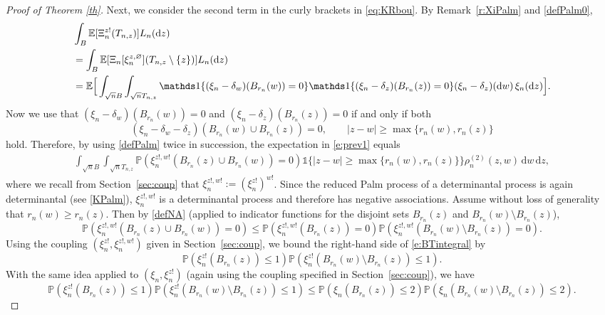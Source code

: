 \documentclass{amsart}
\theoremstyle{plain}
\theoremstyle{definition}
\theoremstyle{remark}
\def\E{\mathbb E}
\def\P{\mathbb P}
\def\one{\mathds1}
\def\d{\mathrm d}
\begin{document}
\begin{proof}[Proof of Theorem \ref{th}]
Next, we consider the second term in the curly brackets in \eqref{eq:KRbou}. By Remark~\ref{r:XiPalm} and \eqref{defPalm0},
\begin{align}
	&\int_{B}  \E[\Xi_n^{z!}(T_{n,z})] L_n(\d z)\notag \\
	&=\int_{B}  \E[\Xi_n[\xi_n^{z,\varnothing}](T_{n,z}\setminus \{z\})] L_n(\d z)\notag \\
	&=\E\Big[\int_{\sqrt n B} \int_{\sqrt n T_{n,z}} \one\{(\xi_n-\delta_w)(B_{r_n}(w)) =0\} \one\{(\xi_n-\delta_z)(B_{r_n}(z)) =0\} (\xi_n-\delta_z) (\d w)\,  \xi_n(\d z)\Big].\label{e:prev1}
\end{align}
Now we use that $(\xi_n-\delta_w)(B_{r_n}(w)) =0$ and $(\xi_n-\delta_z)(B_{r_n}(z)) =0$ if and only if both 
\[ (\xi_n-\delta_w-\delta_z)(B_{r_n}(w) \cup B_{r_n}(z)) =0, \qquad |z-w|\ge \max\{r_n(w),r_n(z)\}\]
hold.  Therefore, by using \eqref{defPalm} twice in succession, the expectation in \eqref{e:prev1} equals 
\begin{align}\label{e:2ndterm}
\int_{\sqrt n B} \int_{\sqrt n T_{n,z}} \P(\xi_n^{z!, w!}(B_{r_n}(z) \cup B_{r_n}(w))=0)\one\{|z-w|\ge \max\{r_n(w),r_n(z)\}\}  \rho_n^{(2)}(z,w) \, \d w \, \d z,
\end{align}
where we recall from Section~\ref{sec:coup} that $\xi_n^{z!, w!}:=(\xi_n^{z!})^{w!}$. Since the reduced Palm process of a determinantal process is again determinantal (see \eqref{KPalm}), $\xi_n^{z!, w!}$ is a determinantal process and therefore has negative associations. Assume without loss of generality that $r_n(w) \ge r_n(z)$. Then by \eqref{defNA} (applied to indicator functions for the disjoint sets $B_{r_n}(z)$ and $B_{r_n}(w)\setminus B_{r_n}(z)$),
\begin{equation}\label{e:BTintegral}
  \P(\xi_n^{z!, w!}(B_{r_n}(z) \cup B_{r_n}(w))=0) \le \P(\xi_n^{z!, w!}(B_{r_n}(z))=0) \P(\xi_n^{z!, w!}(B_{r_n}(w) \setminus B_{r_n}(z))=0).
\end{equation}
Using the coupling $(\xi_n^{z!},\xi_n^{z!,w!})$ given in Section~\ref{sec:coup}, we bound the right-hand side of \eqref{e:BTintegral} by 
\[
 \P(\xi_n^{z!}(B_{r_n}(z))\le 1) \P(\xi_n^{z!}(B_{r_n}(w) \setminus B_{r_n}(z))\le 1).
\]
With the same idea applied to $(\xi_n, \xi_n^{z!})$ (again using the coupling specified in Section~\ref{sec:coup}), we have
\begin{equation}\label{e:exclambounds}
 \P(\xi_n^{z!}(B_{r_n}(z))\le 1) \P(\xi_n^{z!}(B_{r_n}(w) \setminus B_{r_n}(z))\le 1) \le \P(\xi_n(B_{r_n}(z))\le 2) \P(\xi_n(B_{r_n}(w) \setminus B_{r_n}(z))\le 2).
\end{equation}

\end{proof}
\end{document}
